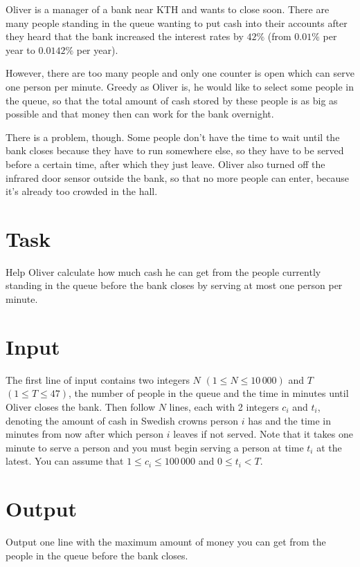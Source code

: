 
Oliver is a manager of a bank near KTH and wants to close soon. There are many people standing in
the queue wanting to put cash into their accounts after they heard that the bank increased the interest
rates by $42\%$ (from $0.01\%$ per year to $0.0142\%$ per year).

However, there are too many people and only one counter is open which can serve one person per
minute. Greedy as Oliver is, he would like to select some people in the queue, so that the total
amount of cash stored by these people is as big as possible and that money then can work for the bank
overnight.

There is a problem, though. Some people don't have the time to wait until the bank closes because they have
to run somewhere else, so they have to be served before a certain time, after which they just leave.
Oliver also turned off the infrared door sensor outside the bank, so that no more people can enter, because it's already too crowded in the hall.

\section*{Task}

Help Oliver calculate how much cash he can get from the people currently standing in the
queue before the bank closes by serving at most one person per minute.

\section*{Input}
The first line of input contains two integers $N$ $(1\leq N\leq 10\,000)$ and $T$ $(1\le T \le 47)$,
the number of people in the queue and the time in minutes until Oliver closes the bank. Then
follow $N$ lines, each with 2 integers $c_i$ and $t_i$, denoting the amount of cash in Swedish
crowns person $i$ has and the time in minutes from now after which person $i$ leaves if not served.
Note that it takes one minute to serve a person and you must begin serving a person at time $t_i$ at the
latest. You can assume that $1\le c_i \le 100\,000$ and $0 \le t_i < T$.

\section*{Output}
Output one line with the maximum amount of money you can get from the people in the queue before the
bank closes.
